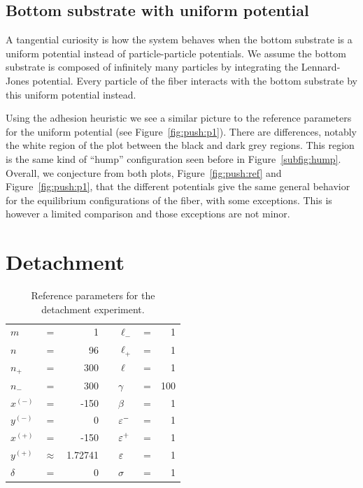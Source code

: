 {\subsection{Bottom substrate with uniform potential} \label{section:compression:pressure}

A tangential curiosity is how the system behaves when the bottom substrate is a uniform potential instead of particle-particle potentials. We assume the bottom substrate is composed of infinitely many particles by integrating the Lennard-Jones potential. Every particle of the fiber interacts with the bottom substrate by this uniform potential instead.

Using the adhesion heuristic we see a similar picture to the reference parameters for the uniform potential (see Figure~\ref{fig:push:p1}). There are differences, notably the white region of the plot between the black and dark grey regions. This region is the same kind of ``hump'' configuration seen before in Figure~\ref{subfig:hump}. Overall, we conjecture from both plots, Figure~\ref{fig:push:ref} and Figure~\ref{fig:push:p1}, that the different potentials give the same general behavior for the equilibrium configurations of the fiber, with some exceptions. This is however a limited comparison and those exceptions are not minor.

\section{Detachment} \label{ch:detachment}

   \begin{table}[t]
      \centering
      \caption{Reference parameters for the detachment experiment. \label{table:detachment_reference}}
      \begin{tabular}{lcrclcr}
         $m$ & = & 1 & \hspace{1in} & $\ell_-$ & = & 1 \\
         $n$ & = & 96 & & $\ell_+$ & = & 1 \\
         $n_+$ & = & 300 & & $\ell$ & = & 1 \\
         $n_-$ & = & 300 & & $\gamma$ & = & 100 \\
         $x^{(-)}$ & = & -150 & & $\beta$ & = & 1 \\
         $y^{(-)}$ & = & 0 & & $\varepsilon^-$ & = & 1 \\
         $x^{(+)}$ & = & -150 & & $\varepsilon^+$ & = & 1 \\
         $y^{(+)}$ & $\approx$ & 1.72741 & & $\varepsilon$ & = & 1 \\
         $\delta$ & = & 0 & & $\sigma$ & = & 1
      \end{tabular}
   \end{table}

}
